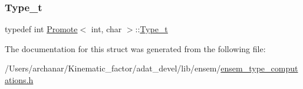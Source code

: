 \subsubsection{\texorpdfstring{Type\_t}{Type\_t}\hspace{0.1cm}{\footnotesize\ttfamily [2/2]}}
{\footnotesize\ttfamily typedef int \mbox{\hyperlink{structPromote}{Promote}}$<$ int, char $>$\+::\mbox{\hyperlink{structPromote_3_01int_00_01char_01_4_a0e318e07696fbce55dd03513e6452a2c}{Type\+\_\+t}}}



The documentation for this struct was generated from the following file\+:\begin{DoxyCompactItemize}
\item 
/\+Users/archanar/\+Kinematic\+\_\+factor/adat\+\_\+devel/lib/ensem/\mbox{\hyperlink{lib_2ensem_2ensem__type__computations_8h}{ensem\+\_\+type\+\_\+computations.\+h}}\end{DoxyCompactItemize}
